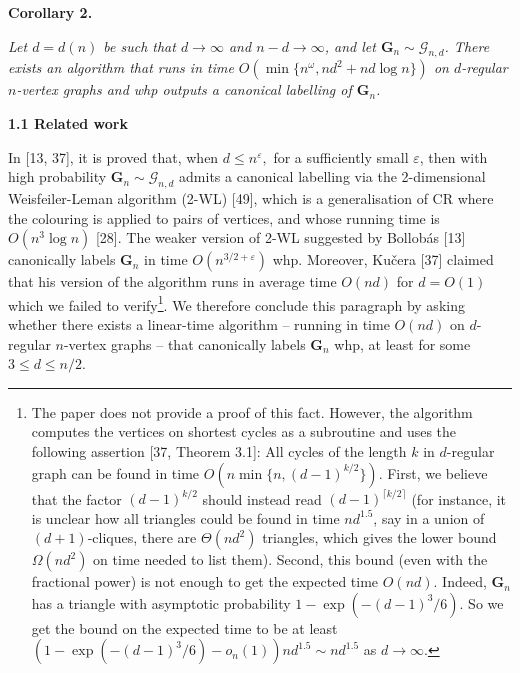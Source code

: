 

\par\medskip\noindent\textbf{
\textbf{Corollary 2}\textbf{.}
}\par



\emph{Let $d=d(n)$ be such that $d\to\infty$ and $n-d\to\infty$, and let $\mathbf{G}_{n}\sim\mathcal{G}_{n,d}$. There exists an algorithm that runs in time $O(\min\{n^{\omega},nd^{2}+nd\log n\})$ on $d$-regular $n$-vertex graphs and whp outputs a canonical labelling of $\mathbf{G}_{n}$.}\par






\par\medskip\noindent\textbf{
1.1 Related work}\par




In [13, 37], it is proved that, when $d\leq n^{\varepsilon},$ for a sufficiently small $\varepsilon$, then with high probability $\mathbf{G}_{n}\sim\mathcal{G}_{n,d}$ admits a canonical labelling via the 2-dimensional Weisfeiler-Leman algorithm (2-WL) [49], which is a generalisation of CR where the colouring is applied to pairs of vertices, and whose running time is $O(n^{3}\log n)$ [28]. The weaker version of 2-WL suggested by Bollobás [13]
canonically labels $\mathbf{G}_{n}$ in time $O(n^{3/2+\varepsilon})$ whp. Moreover, Kučera [37] claimed that his version of the algorithm runs in average time $O(nd)$ for $d=O(1)$ which we failed to verify\footnote{The paper does not provide a proof of this fact. However, the algorithm computes the vertices on shortest cycles as a subroutine and uses the following assertion [37, Theorem 3.1]: All cycles of the length $k$ in $d$-regular graph can be found in time $O(n\min\{n,(d-1)^{k/2}\})$. First, we believe that the factor $(d-1)^{k/2}$ should instead read $(d-1)^{\lceil k/2\rceil}$ (for instance, it is unclear how all triangles could be found in time $nd^{1.5}$, say in a union of $(d+1)$-cliques, there are $\Theta(nd^{2})$ triangles, which gives the lower bound $\Omega(nd^{2})$ on time needed to list them). Second, this bound (even with the fractional power) is not enough to get the expected time $O(nd)$. Indeed, $\mathbf{G}_{n}$ has a triangle with asymptotic probability $1-\exp(-(d-1)^{3}/6)$. So we get the bound on the expected time to be at least $(1-\exp(-(d-1)^{3}/6)-o_{n}(1))nd^{1.5}\sim nd^{1.5}$ as $d\to\infty$.}. We therefore conclude this paragraph by asking whether there exists a linear-time algorithm – running in time $O(nd)$ on $d$-regular $n$-vertex graphs – that canonically labels $\mathbf{G}_{n}$ whp, at least for some $3\leq d\leq n/2$.\par




